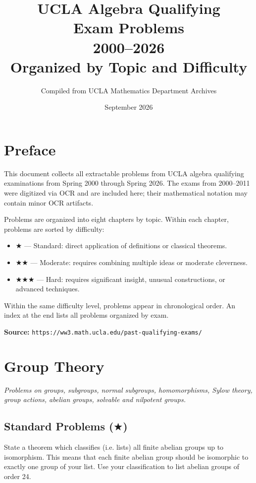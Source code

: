 \documentclass[11pt,letterpaper]{book}
\title{\Huge\bfseries UCLA Algebra Qualifying\\[0.3em]Exam Problems\\[0.5em]{\Large 2000--2026}\\[1em]
{\normalsize Organized by Topic and Difficulty}}
\author{Compiled from UCLA Mathematics Department Archives}
\date{September 2026}
\newcounter{probnum}[chapter]
\renewcommand{\theprobnum}{\thechapter.\arabic{probnum}}
\newenvironment{problem}[1]{%
  \refstepcounter{probnum}%
  \begin{tcolorbox}[
    enhanced,
    breakable,
    colback=gray!6,
    colframe=gray!40,
    title={\textbf{Problem~\theprobnum}\quad #1},
    fonttitle=\small\sffamily,
    coltitle=black,
    attach boxed title to top left={yshift=-2mm,xshift=4mm},
    boxed title style={colback=white,colframe=gray!40},
  ]%
}{%
  \end{tcolorbox}%
}
\begin{document}
\maketitle
\tableofcontents
\clearpage

\chapter*{Preface}

This document collects all extractable problems from UCLA algebra qualifying examinations from Spring 2000 through Spring 2026. The exams from 2000--2011 were digitized via OCR and are included here; their mathematical notation may contain minor OCR artifacts.

Problems are organized into eight chapters by topic. Within each chapter, problems are sorted by difficulty:
\begin{itemize}
  \item $\bigstar$ --- Standard: direct application of definitions or classical theorems.
  \item $\bigstar\bigstar$ --- Moderate: requires combining multiple ideas or moderate cleverness.
  \item $\bigstar\bigstar\bigstar$ --- Hard: requires significant insight, unusual constructions, or advanced techniques.
\end{itemize}

Within the same difficulty level, problems appear in chronological order. An index at the end lists all problems organized by exam.

\medskip
\noindent\textbf{Source:} \texttt{https://ww3.math.ucla.edu/past-qualifying-exams/}

\chapter{Group Theory}
\textit{Problems on groups, subgroups, normal subgroups, homomorphisms, Sylow theory, group actions, abelian groups, solvable and nilpotent groups.}

\section{Standard Problems ($\bigstar$)}


\begin{problem}{Exam: Spring 2000, A1 \quad|\quad Difficulty: $\bigstar$ \quad|\quad Interest: $\diamondsuit$}
State a theorem which classifies (i.e. lists) all finite abelian
groups up to isomorphism. This means that each finite abelian group should
be isomorphic to exactly one group of your list. Use your classification to list
abelian groups of order 24.
\end{problem}
\end{document}

